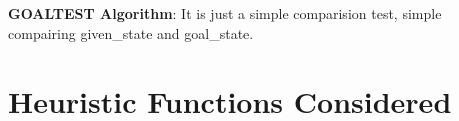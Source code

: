 \documentclass[a4paper,10pt,reqno,oneside]{amsart}
\begin{document}
\textbf{GOALTEST Algorithm}: It is just a simple comparision test, simple 
compairing given\_state and goal\_state.

\section{Heuristic Functions Considered}
\end{document}
